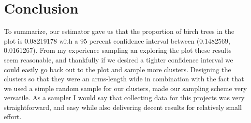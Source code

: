 \documentclass[12pt]{amsart}
\begin{document}
\section{Conclusion}
To summarize, our estimator gave us that the proportion of birch trees in the plot is  0.08219178 with 
a 95 percent confidence interval between (0.1482569, 0.0161267). From my experience sampling an exploring the plot 
these results seem reasonable, and thankfully if we desired a tighter confidence interval we could easily go back out to the 
plot and sample more clusters. Designing the clusters so that they were an arms-length wide in combination with the fact that 
we used a simple random sample for our clusters, made our sampling scheme very versatile. As a sampler I would say that collecting 
data for this projects was very straightforward, and easy while also delivering decent results for relatively small effort. 
\end{document}
